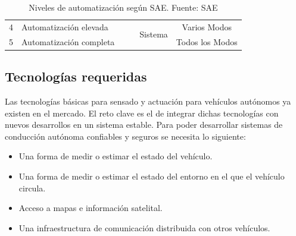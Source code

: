 \begin{table}[!h]
{\begin{tabular}{@{}|c|l|c|c|c|c|@{}}
            4                  & Automatización elevada     &                                                                                          &                                                                           & \multirow{2}{*}{Sistema}                                                                 & Varios Modos                                                            \\ \cmidrule(r){1-2} \cmidrule(l){6-6} 
            5                  & Automatización completa    &                                                                                          &                                                                           &                                                                                          & Todos los Modos                                                         \\ \bottomrule
            \end{tabular}%
            }
            \caption[Niveles de automatización según SAE.]{Niveles de automatización según SAE. Fuente: SAE} %
            \label{tbl:niveles}
            \end{table}

    
    \subsection{Tecnologías requeridas}
    Las tecnologías básicas para sensado y actuación para vehículos autónomos ya existen en el mercado. El reto clave es el 
    de integrar dichas tecnologías con nuevos desarrollos en un sistema estable. Para poder desarrollar sistemas de conducción 
    autónoma confiables y seguros se necesita lo siguiente:

    \begin{itemize}
        \item Una forma de medir o estimar el estado del vehículo.
        \item Una forma de medir o estimar el estado del entorno en el que el vehículo circula.
        \item Acceso a mapas e información satelital.
        \item Una infraestructura de comunicación distribuida con otros vehículos.
    \end{itemize}

